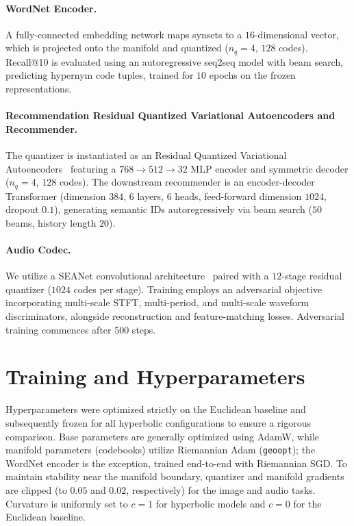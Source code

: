 \documentclass[12pt]{report}
\begin{document}
\paragraph{WordNet Encoder.} A fully-connected embedding network maps synsets to a $16$-dimensional vector, which is projected onto the manifold and quantized ($n_q=4$, $128$ codes). Recall@10 is evaluated using an autoregressive seq2seq model with beam search, predicting hypernym code tuples, trained for $10$ epochs on the frozen representations.

\paragraph{Recommendation Residual Quantized Variational Autoencoders and Recommender.} The quantizer is instantiated as an Residual Quantized Variational Autoencoders~\cite{lee2022rqvae,hrqvae} featuring a $768\!\to\!512\!\to\!32$ MLP encoder and symmetric decoder ($n_q=4$, $128$ codes). The downstream recommender is an encoder-decoder Transformer (dimension $384$, $6$ layers, $6$ heads, feed-forward dimension $1024$, dropout $0.1$), generating semantic IDs autoregressively via beam search ($50$ beams, history length $20$).

\paragraph{Audio Codec.} We utilize a SEANet convolutional architecture~\cite{soundstream,encodec} paired with a $12$-stage residual quantizer ($1024$ codes per stage). Training employs an adversarial objective incorporating multi-scale STFT, multi-period, and multi-scale waveform discriminators, alongside reconstruction and feature-matching losses. Adversarial training commences after $500$ steps.

\section{Training and Hyperparameters}
\label{sec:hparams}

Hyperparameters were optimized strictly on the Euclidean baseline and subsequently frozen for all hyperbolic configurations to ensure a rigorous comparison. Base parameters are generally optimized using AdamW, while manifold parameters (codebooks) utilize Riemannian Adam (\texttt{geoopt}); the WordNet encoder is the exception, trained end-to-end with Riemannian SGD. To maintain stability near the manifold boundary, quantizer and manifold gradients are clipped (to $0.05$ and $0.02$, respectively) for the image and audio tasks. Curvature is uniformly set to $c=1$ for hyperbolic models and $c=0$ for the Euclidean baseline.
\end{document}
